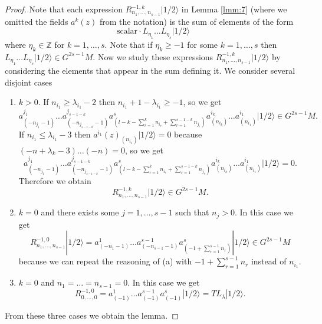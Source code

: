 \documentclass[12pt, a4paper]{article}
\newcommand{\vachalf}{|1/2\rangle}
\begin{document}
\begin{proof}
  Note that each expression $R^{-1,k}_{n_1,\dots,n_{s-1}}\vachalf$ in Lemma \ref{lmm:7} (where we omitted the fields $a^k(z)$ from the notation) is the sum of elements of the form
  \begin{equation*}
    \text{scalar}\cdot L_{\eta_1}\dots L_{\eta_s}\vachalf
  \end{equation*}
  where $\eta_k\in \mathbb{Z}$ for $k=1,\dots,s$.
  Note that if $\eta_k\ge -1$ for some $k=1,\dots,s$ then $L_{\eta_1}\dots L_{\eta_s}\vachalf\in G^{2s-1}M$.
  Now we study these expressions $R^{-1,k}_{n_1,\dots,n_{s-1}}\vachalf$ by considering the elements that appear in the sum defining it.
  We consider several disjoint cases
  \begin{enumerate}[label={(\alph*)}]
  \item $k>0$. If $n_{i_1}\ge \lambda_{i_1}-2$ then $n_{i_1}+1-\lambda_{i_1}\ge -1$, so we get
    \begin{equation*}
      a^{j_1}_{(-n_{j_1}-1)}\dots a^{j_{s-1-k}}_{(-n_{j_{s-1-k}}-1)}a^s_{(l-k-\sum_{r=1}^k n_{i_r}+\sum_{r=1}^{s-1-k}n_{j_r})}a^{i_k}_{(n_{i_k})}\dots a^{i_1}_{(n_{i_1})}\vachalf\in G^{2s-1}M.
    \end{equation*}
    If $n_{i_1}\le \lambda_{i_1}-3$ then $a^{i_1}(z)_{(n_{i_1})}\vachalf=0$ because $(-n+\lambda_k-3)\dots(-n)=0$, so we get
    \begin{equation*}
      a^{j_1}_{(-n_{j_1}-1)}\dots a^{j_{s-1-k}}_{(-n_{j_{s-1-k}}-1)}a^s_{(l-k-\sum_{r=1}^k n_{i_r}+\sum_{r=1}^{s-1-k}n_{j_r})}a^{i_k}_{(n_{i_k})}\dots a^{i_1}_{(n_{i_1})}\vachalf=0.
    \end{equation*}
    Therefore we obtain
    \begin{equation*}
      R^{-1,k}_{n_1,\dots,n_{s-1}}\vachalf\in G^{2s-1}M.
    \end{equation*}
  \item $k=0$ and there exists some $j=1,\dots,s-1$ such that $n_j>0$.
    In this case we get
    \begin{equation*}
      R^{-1,0}_{n_1,\dots,n_{s-1}}\vachalf=a^1_{(-n_1-1)}\dots a^{s-1}_{(-n_{s-1}-1)}a^s_{(-1+\sum_{r=1}^{s-1}n_r)}\vachalf\in G^{2s-1}M
    \end{equation*}
    because we can repeat the reasoning of (a) with $-1+\sum_{r=1}^{s-1}n_r$ instead of $n_{i_1}$.
  \item $k=0$ and $n_1=\dots=n_{s-1}=0$. In this case we get
    \begin{equation*}
      R^{-1,0}_{0,\dots,0}=a^1_{(-1)}\dots a^{s-1}_{(-1)}a^s_{(-1)}\vachalf=TL_\lambda\vachalf.
    \end{equation*}
  \end{enumerate}
  From these three cases we obtain the lemma.
\end{proof}
\end{document}
